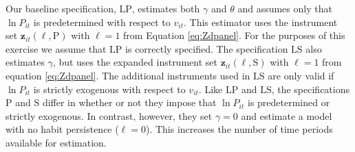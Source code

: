 Our baseline specification, $\text{LP}$, estimates both $\gamma$ and $\theta$ and assumes only that $\ln P_{it}$ is predetermined with respect to $v_{it}$. 
This estimator uses the instrument set $\mathbf{z}_{it}(\ell, \text{P})$ with $\ell = 1$ from Equation \ref{eq:Zdpanel}.
For the purposes of this exercise we assume that $\text{LP}$ is correctly specified.
The specification $\text{LS}$ also estimates $\gamma$, but uses the expanded instrument set $\mathbf{z}_{it}(\ell, \text{S})$ with $\ell=1$ from equation \ref{eq:Zdpanel}.
The additional instruments used in $\text{LS}$ are only valid if $\ln P_{it}$ is strictly exogenous with respect to $v_{it}$.
Like $\text{LP}$ and $\text{LS}$, the specifications $\text{P}$ and $\text{S}$ differ in whether or not they impose that $\ln P_{it}$ is predetermined or strictly exogenous.
In contrast, however, they set $\gamma = 0$ and estimate a model with no habit persistence ($\ell =0$).
This increases the number of time periods available for estimation.


